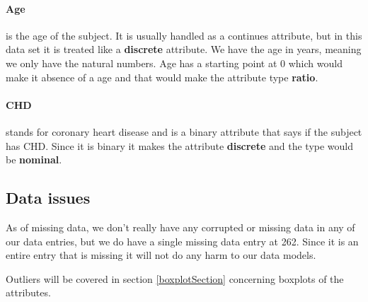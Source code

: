 \paragraph{Age} is the age of the subject. It is usually handled as a continues attribute, but in this data set it is treated like a \textbf{discrete} attribute. We have the age in years, meaning we only have the natural numbers. Age has a starting point at 0 which would make it absence of a age and that would make the attribute type \textbf{ratio}.

\paragraph{CHD} stands for coronary heart disease and is a binary attribute that says if the subject has CHD. Since it is binary it makes the attribute \textbf{discrete} and the type would be \textbf{nominal}.

\subsection{Data issues}
As of missing data, we don't really have any corrupted or missing data in any of our data entries, but we do have a single missing data entry at 262. Since it is an entire entry that is missing it will not do any harm to our data models.

Outliers will be covered in section \ref{boxplotSection} concerning boxplots of the attributes.

